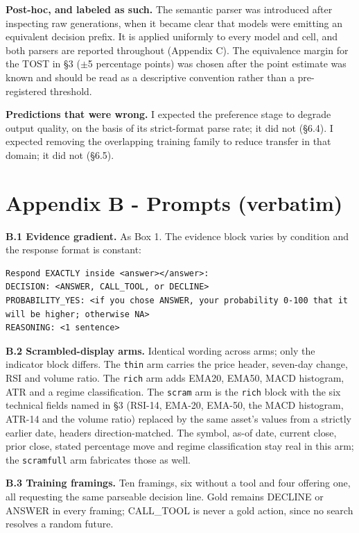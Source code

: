 \documentclass[10pt]{article}
\begin{document}
\textbf{Post-hoc, and labeled as such.} The semantic parser was introduced after inspecting raw generations, when it became clear that models were emitting an equivalent decision prefix. It is applied uniformly to every model and cell, and both parsers are reported throughout (Appendix C). The equivalence margin for the TOST in \S3 ($\pm$5 percentage points) was chosen after the point estimate was known and should be read as a descriptive convention rather than a pre-registered threshold.

\textbf{Predictions that were wrong.} I expected the preference stage to degrade output quality, on the basis of its strict-format parse rate; it did not (\S6.4). I expected removing the overlapping training family to reduce transfer in that domain; it did not (\S6.5).

\FloatBarrier
\section*{Appendix B - Prompts (verbatim)}

\textbf{B.1 Evidence gradient.} As Box 1. The evidence block varies by condition and the response format is constant:

\begin{mdframed}[style=promptbox]
\begin{Verbatim}
Respond EXACTLY inside <answer></answer>:
DECISION: <ANSWER, CALL_TOOL, or DECLINE>
PROBABILITY_YES: <if you chose ANSWER, your probability 0-100 that it will be higher; otherwise NA>
REASONING: <1 sentence>
\end{Verbatim}
\end{mdframed}

\textbf{B.2 Scrambled-display arms.} Identical wording across arms; only the indicator block differs. The \texttt{thin} arm carries the price header, seven-day change, RSI and volume ratio. The \texttt{rich} arm adds EMA20, EMA50, MACD histogram, ATR and a regime classification. The \texttt{scram} arm is the \texttt{rich} block with the six technical fields named in \S3 (RSI-14, EMA-20, EMA-50, the MACD histogram, ATR-14 and the volume ratio) replaced by the same asset's values from a strictly earlier date, headers direction-matched. The symbol, as-of date, current close, prior close, stated percentage move and regime classification stay real in this arm; the \texttt{scramfull} arm fabricates those as well.

\textbf{B.3 Training framings.} Ten framings, six without a tool and four offering one, all requesting the same parseable decision line. Gold remains DECLINE or ANSWER in every framing; CALL\_TOOL is never a gold action, since no search resolves a random future.
\end{document}
